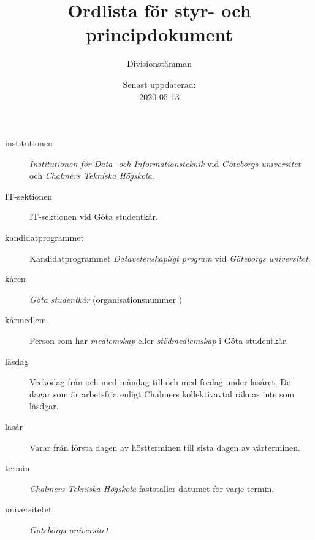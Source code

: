\documentclass{dvd}
\begin{document}
	\title{Ordlista för styr- och principdokument}
	\author{Divisionstämman}
	\date{Senast uppdaterad:\\2020-05-13}

	\begin{description}
		\item[institutionen] \emph{Institutionen för Data- och Informationsteknik} vid \emph{Göteborgs universitet} och \emph{Chalmers Tekniska Högskola}.

		\item[IT-sektionen] IT-sektionen vid Göta studentkår.

		\item[kandidatprogrammet] Kandidatprogrammet \emph{Datavetenskapligt program} vid \emph{Göteborgs universitet}.

		\item[kåren] \emph{Göta studentkår} (organisationsnummer )

		\item[kårmedlem] Person som har \emph{medlemskap} eller \emph{stödmedlemskap} i Göta studentkår.

		\item[läsdag] Veckodag från och med måndag till och med fredag under läsåret.
					  De dagar som är arbetsfria enligt Chalmers kollektivavtal räknas inte som läsdgar.

		\item[läsår] Varar från första dagen av höstterminen till sista dagen av vårterminen.

		\item[termin] \emph{Chalmers Tekniska Högskola} fastställer datumet för varje termin.

		\item[universitetet] \emph{Göteborgs universitet}
	\end{description}
\end{document}
